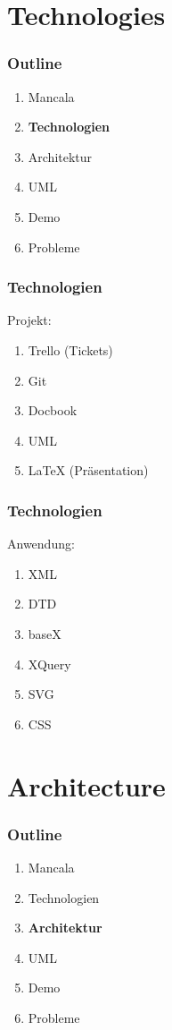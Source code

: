 \documentclass[
	10pt,
	t		%
]{beamer}
\begin{document}
\section{Technologies}
\begin{frame}
\frametitle{Outline}
\begin{enumerate}
\item Mancala
\item \textbf{Technologien}
\item Architektur
\item UML
\item Demo
\item Probleme
\end{enumerate}
\end{frame}

\begin{frame}
\frametitle{Technologien}
Projekt:
\begin{enumerate}
	\item Trello (Tickets)
	\item Git
	\item Docbook
	\item UML
	\item LaTeX (Pr\"asentation)
\end{enumerate}
\end{frame}

\begin{frame}
\frametitle{Technologien}
Anwendung:
\begin{enumerate}
	\item XML
	\item DTD
	\item baseX
	\item XQuery
	\item SVG
	\item CSS
\end{enumerate}
\end{frame}

\section{Architecture}
\begin{frame}
\frametitle{Outline}
\begin{enumerate}
\item Mancala
\item Technologien
\item \textbf{Architektur}
\item UML
\item Demo
\item Probleme
\end{enumerate}
\end{frame}
\end{document}
